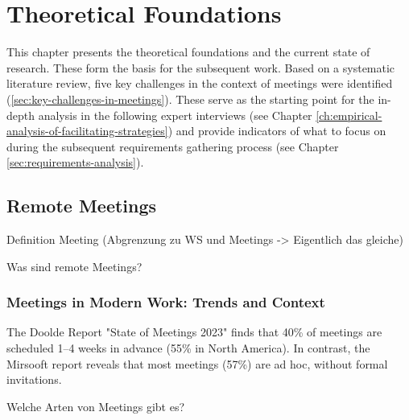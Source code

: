 \chapter{Theoretical Foundations}
This chapter presents the theoretical foundations and the current state of research. These form the basis for
the subsequent work. Based on a systematic literature review, five key challenges in the context of meetings
were identified (\ref{sec:key-challenges-in-meetings}). These serve as the starting point for the in-depth
analysis in the following expert interviews (see Chapter \ref{ch:empirical-analysis-of-facilitating-strategies}) and
provide indicators of what to focus on during the subsequent requirements gathering process (see Chapter
\ref{sec:requirements-analysis}).

\section{Remote Meetings}

Definition Meeting (Abgrenzung zu WS und Meetings -> Eigentlich das gleiche)

Was sind remote Meetings?

\subsection{Meetings in Modern Work: Trends and Context}
\label{sec:meetings-in-modern-work}

The Doolde Report "State of Meetings 2023" finds that 40\% of meetings are scheduled 1–4 weeks in advance (55\%
in North America). In contrast, the Mirsooft report reveals that most meetings (57\%) are ad hoc, without
formal invitations. \cite{bobbyDoodleStateMeetings2026}

Welche Arten von Meetings gibt es?

